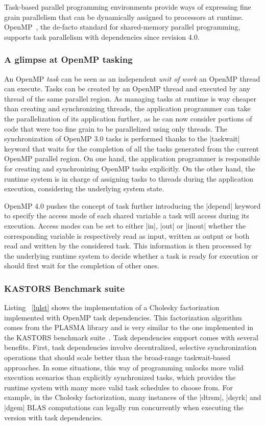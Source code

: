 \documentclass{Styles/llncs}
\begin{document}
Task-based parallel programming environments provide ways of expressing fine grain parallelism that can be dynamically assigned to processors at runtime.
OpenMP~\cite{openmp40}, the de-facto standard for shared-memory parallel programming, supports task parallelism with dependencies since revision 4.0.

\subsubsection{A glimpse at OpenMP tasking}

An OpenMP \emph{task} can be seen as an independent \emph{unit of work} an OpenMP thread can execute.
Tasks can be created by an OpenMP thread and executed by any thread of the same parallel region. 
As managing tasks at runtime is way cheaper than creating and synchronizing threads, the application programmer can take the parallelization of its application further, as he can now consider portions of code that were too fine grain to be parallelized using only threads.
The synchronization of OpenMP 3.0 tasks is performed thanks to the |taskwait| keyword that waits for the completion of all the tasks generated from the current OpenMP parallel region.
On one hand, the application programmer is responsible for creating and synchronizing OpenMP tasks explicitly. 
On the other hand, the runtime system is in charge of assigning tasks to threads during the application execution, considering the underlying system state.

OpenMP 4.0 pushes the concept of task further introducing the |depend| keyword to specify the access mode of each shared variable a task will access during its execution. 
Access modes can be set to either |in|, |out| or |inout| whether the corresponding variable is respectively read as input, written as output or both read and written by the considered task. 
This information is then processed by the underlying runtime system to decide whether a task is ready for execution or should first wait for the completion of other ones.

\subsubsection{KASTORS Benchmark suite}
Listing ~\ref{lulst} shows the implementation of a Cholesky factorization 
implemented with OpenMP task dependencies. 
This factorization algorithm comes from the PLASMA library and is very similar to the one implemented in the KASTORS benchmark suite~\cite{virouleau:hal-01081974}.
Task dependencies support comes with several benefits. First, task
dependencies involve decentralized, selective synchronization operations
that should scale better than the broad-range taskwait-based approaches.
In some situations, this way of programming unlocks more valid execution
scenarios than explicitly synchronized tasks, which provides the runtime
system with many more valid task schedules to choose from. For example, in the Cholesky factorization,
many instances of  the |dtrsm|, |dsyrk| and |dgem| BLAS computations can legally
run concurrently when executing the version with task dependencies.
\end{document}
